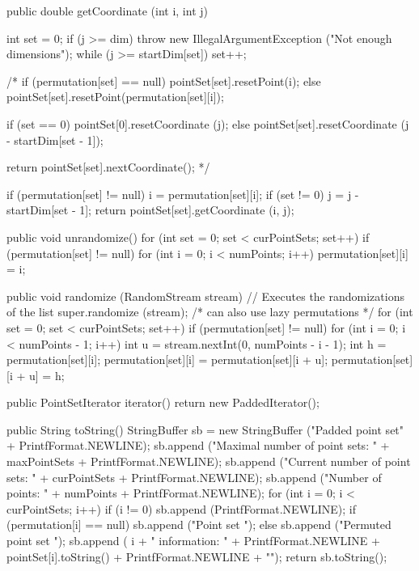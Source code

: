 \begin{htmlonly}
\end{htmlonly}
\begin{code}\begin{hide}

   public double getCoordinate (int i, int j) {
      int set = 0;
      if (j >= dim)
         throw new IllegalArgumentException ("Not enough dimensions");
      while (j >= startDim[set])
         set++;

      /*
      if (permutation[set] == null)
         pointSet[set].resetPoint(i);
      else
         pointSet[set].resetPoint(permutation[set][i]);

      if (set == 0)
         pointSet[0].resetCoordinate (j);
      else
         pointSet[set].resetCoordinate (j - startDim[set - 1]);
      
      return pointSet[set].nextCoordinate();
      */

      if (permutation[set] != null)
         i = permutation[set][i];
      if (set != 0)
         j = j - startDim[set - 1];
      return pointSet[set].getCoordinate (i, j);
   }

   public void unrandomize() {
      for (int set = 0; set < curPointSets; set++) {
         if (permutation[set] != null) {
            for (int i = 0; i < numPoints; i++)
               permutation[set][i] = i;
         }
      }
   }

   public void randomize (RandomStream stream)  {
      // Executes the randomizations of the list
      super.randomize (stream);
      /* can also use lazy permutations */
      for (int set = 0; set < curPointSets; set++)
         if (permutation[set] != null) {
             for (int i = 0; i < numPoints - 1; i++) {
                 int u = stream.nextInt(0, numPoints - i - 1);
                 int h = permutation[set][i];
                 permutation[set][i] = permutation[set][i + u];
                 permutation[set][i + u] = h;
             }
         }
   }

   public PointSetIterator iterator() {
      return new PaddedIterator();
   }

   public String toString() {
      StringBuffer sb = new StringBuffer ("Padded point set" +
                                           PrintfFormat.NEWLINE);
      sb.append ("Maximal number of point sets: " + maxPointSets +
                  PrintfFormat.NEWLINE);
      sb.append ("Current number of point sets: " + curPointSets +
                  PrintfFormat.NEWLINE);
      sb.append ("Number of points: " + numPoints + PrintfFormat.NEWLINE);
      for (int i = 0; i < curPointSets; i++) {
         if (i != 0)
            sb.append (PrintfFormat.NEWLINE);
         if (permutation[i] == null)
            sb.append ("Point set ");
         else
            sb.append ("Permuted point set ");
         sb.append ( i + " information: {" + PrintfFormat.NEWLINE 
                + pointSet[i].toString() + PrintfFormat.NEWLINE + "}");
      }
      return sb.toString();
   }



\end{hide}
\end{code}
